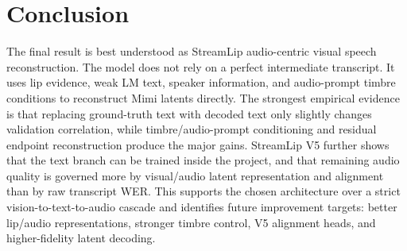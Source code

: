 \documentclass{article}
\begin{document}
\section{Conclusion}

The final result is best understood as StreamLip audio-centric visual
speech reconstruction. The model does not rely on a perfect intermediate
transcript. It uses lip evidence, weak LM text, speaker information, and
audio-prompt timbre conditions to reconstruct Mimi latents directly. The
strongest empirical evidence is that replacing ground-truth text with decoded
text only slightly changes validation correlation, while timbre/audio-prompt
conditioning and residual endpoint reconstruction produce the major gains.
StreamLip V5 further shows that the text branch can be trained inside the
project, and that remaining audio quality is governed more by visual/audio
latent representation and alignment than by raw transcript WER. This supports
the chosen architecture over a strict vision-to-text-to-audio cascade and
identifies future improvement targets: better lip/audio representations,
stronger timbre control, V5 alignment heads, and higher-fidelity latent decoding.
\end{document}
